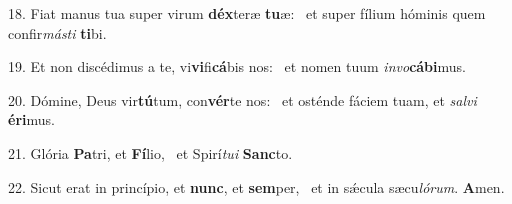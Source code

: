 18. Fiat manus tua super virum \textbf{déx}teræ \textbf{tu}æ: \ast\  et super fílium hóminis quem confir\textit{más}\textit{ti} \textbf{ti}bi.\

19. Et non discédimus a te, vi\textbf{vi}fi\textbf{cá}bis nos: \ast\  et nomen tuum \textit{in}\textit{vo}\textbf{cá}\textbf{bi}mus.\

20. Dómine, Deus vir\textbf{tú}tum, con\textbf{vér}te nos: \ast\  et osténde fáciem tuam, et \textit{sal}\textit{vi} \textbf{é}\textbf{ri}mus.\

21. Glória \textbf{Pa}tri, et \textbf{Fí}lio, \ast\  et Spirí\textit{tu}\textit{i} \textbf{Sanc}to.\

22. Sicut erat in princípio, et \textbf{nunc}, et \textbf{sem}per, \ast\  et in sǽcula sæcu\textit{ló}\textit{rum}. \textbf{A}men.\

